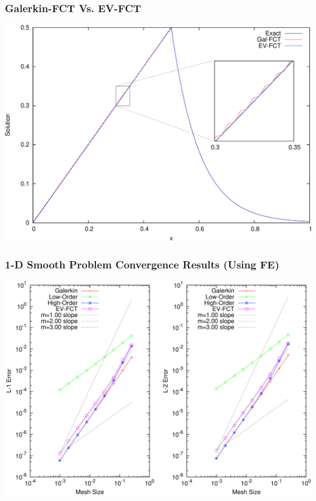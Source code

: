 \documentclass{beamer} \useoutertheme{infolines}
\begin{document}
\begin{frame}
\frametitle{Galerkin-FCT Vs. EV-FCT}

\begin{center}
\includegraphics[height=0.8\textheight]{./figures/sourcevoid_FCT_comparison.pdf}
\end{center}

\end{frame}
\begin{frame}
\frametitle{1-D Smooth Problem Convergence Results (Using FE)}

\begin{center}
\includegraphics[height=0.8\textheight]{./figures/convergence_smooth_FE.pdf}
\end{center}

\end{frame}
\end{document}
